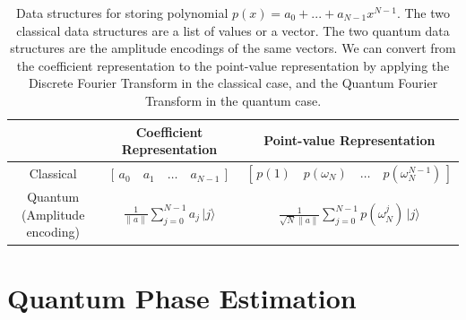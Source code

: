\documentclass[prb,preprint]{revtex4}
\begin{document}
\begin{table}[h!]
	\centering
	\renewcommand{\arraystretch}{1.4} %
	\begin{tabular}{|c|c|c|}
		\hline
		\textbf{} & \textbf{Coefficient Representation} & \textbf{Point-value Representation} \\
		\hline
		Classical &
		$[\,a_0 \quad a_1 \quad \dots \quad a_{N-1}\,]$ &
		$[\,p(1) \quad p(\omega_N) \quad \dots \quad p(\omega_N^{N-1})\,]$ \\[1em]
		\hline
		Quantum (Amplitude encoding) &
		$\displaystyle \frac{1}{\|a\|} \sum_{j=0}^{N-1} a_j \, |j\rangle$ &
		$\displaystyle \frac{1}{\sqrt{N}\|a\|} \sum_{j=0}^{N-1} p(\omega_N^j) \, |j\rangle$ \\
		\hline
	\end{tabular}
	\caption{Data structures for storing polynomial $p(x) = a_0 + ... + a_{N-1} x^{N-1}$. The two classical data structures are a list of values or a vector. The two quantum data structures are the amplitude encodings of the same vectors. We can convert from the coefficient representation to the point-value representation by applying the Discrete Fourier Transform in the classical case, and the Quantum Fourier Transform in the quantum case. }
	\label{tbl:data_structures}
\end{table}




	
	\section{Quantum Phase Estimation}
	\label{sec:qpe}
	
\end{document}

